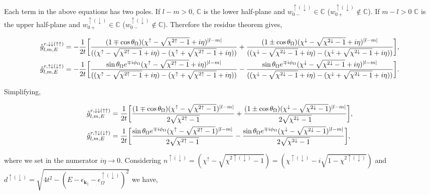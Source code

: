 \documentclass[10pt,prb,showpacs,amssymb,floatfix]{revtex4-1}
\newcommand{\dna}{\downarrow}
\newcommand{\para}{\parallel}
\newcommand{\upa}{\uparrow}
\newcommand{\eps}{\epsilon}
\newcommand{\Og}{\Omega}
\begin{document}
Each term in the above equations has two poles. If $l-m > 0$, $\mathbb{C}$ is the lower half-plane and $w_{0-}^{\upa (\dna)} \in \mathbb{C}$ ($w_{0+}^{\upa (\dna)} \notin \mathbb{C}$). If $m-l > 0$ $\mathbb{C}$ is the upper half-plane and $w_{0+}^{\upa (\dna)} \in \mathbb{C}$ ($w_{0-}^{\upa (\dna)} \notin \mathbb{C}$).  Therefore the residue theorem gives,

\begin{align}
\hat{g}^{r, \dna\dna (\upa\upa)}_{l,m,E} &= -\frac{1}{2t} \bigg{[}   \frac{(1\mp\cos\theta_\Og) (\chi^{\upa } - \sqrt{\chi^{2 \upa } - 1 } + i\eta)^{|l-m|}}{((\chi^{\upa } - \sqrt{\chi^{2 \upa } - 1 } + i\eta) -(\chi^{\upa } + \sqrt{\chi^{2 \upa } - 1 } + i\eta))} + \frac{(1\pm\cos\theta_\Og) (\chi^{\dna} - \sqrt{\chi^{2 \dna} - 1 } + i\eta)^{|l-m|}}{((\chi^{\dna} - \sqrt{\chi^{2 \dna} - 1 } + i\eta) - (\chi^{\dna} + \sqrt{\chi^{2 \dna} - 1 } + i\eta))} \bigg{]},  \\
\hat{g}^{r, \upa\dna(\dna\upa)}_{l, m, E}  &= - \frac{1}{2t} \bigg{[}\frac{ \sin\theta_\Og e^{\mp i\phi_\Og} (\chi^{\upa } - \sqrt{\chi^{2 \upa } - 1 } + i\eta )^{|l-m|}}{ ((\chi^{\upa } - \sqrt{\chi^{2 \upa } - 1 } + i\eta ) -(\chi^{\upa } + \sqrt{\chi^{2 \upa } - 1 } + i\eta)) }   - \frac{ \sin\theta_\Og e^{\mp i\phi_\Og} (\chi^{\dna} - \sqrt{\chi^{2 \dna} - 1 } + i\eta)^{|l-m|}}{((\chi^{\dna} - \sqrt{\chi^{2 \dna} - 1 } + i\eta) - (\chi^{\dna} + \sqrt{\chi^{2 \dna} - 1 } + i\eta))}\bigg{]}.
\end{align}

Simplifying,

\begin{align}
\hat{g}^{r, \dna\dna (\upa\upa)}_{l,m,E} &= \frac{1}{2t} \bigg{[}   \frac{(1\mp\cos\theta_\Og) (\chi^{\upa } - \sqrt{\chi^{2 \upa } - 1 })^{|l-m|}}{ 2\sqrt{\chi^{2 \upa } - 1} } + \frac{(1\pm\cos\theta_\Og) (\chi^{\dna} - \sqrt{\chi^{2 \dna} - 1 })^{|l-m|}}{2\sqrt{\chi^{2 \dna } - 1} } \bigg{]},  \\
\hat{g}^{r, \upa\dna(\dna\upa)}_{l, m, E}  &= \frac{1}{2t} \bigg{[}\frac{ \sin\theta_\Og e^{\mp i\phi_\Og} (\chi^{\upa } - \sqrt{\chi^{2 \upa } - 1 }  )^{|l-m|}}{ 2\sqrt{\chi^{2 \upa } - 1 }  }   - \frac{ \sin\theta_\Og e^{\mp i\phi_\Og} (\chi^{\dna} - \sqrt{\chi^{2 \dna} - 1 } )^{|l-m|}}{ 2\sqrt{\chi^{2 \dna} - 1 } }\bigg{]},
\end{align}

where we set in the numerator $i\eta \rightarrow 0$. Considering $n^{\upa (\dna)} =  (\chi^{\upa } - \sqrt{\chi^{2 \upa (\dna) } - 1 }) = (\chi^{\upa (\dna) } - i\sqrt{1 -\chi^{2 \upa (\dna) }  }) $ and $d^{\upa (\dna)} = \sqrt{ 4t^2 - (E-\eps_{\bm k_\para} - \eps_\Og^{\upa (\dna)})^2 }$ we have,
\end{document}
